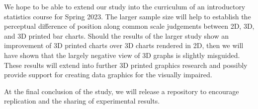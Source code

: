 \documentclass[10pt]{article}
\begin{document}
We hope to be able to extend our study into the curriculum of an introductory statistics course for Spring 2023.
The larger sample size will help to establish the perceptual difference of position along common scale judgements between 2D, 3D, and 3D printed bar charts. 
Should the results of the larger study show an improvement of 3D printed charts over 3D charts rendered in 2D, then we will have shown that the largely negative view of 3D graphs is slightly misguided. 
These results will extend into further 3D printed graphics research and possibly provide support for creating data graphics for the visually impaired.

At the final conclusion of the study, we will release a repository to encourage replication and the sharing of experimental results.


\end{document}
